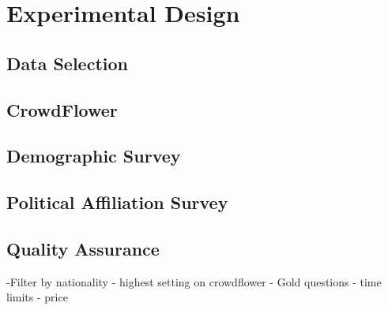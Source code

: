 \chapter{Experimental Design}
\section{Data Selection}
\section{CrowdFlower}
\section{Demographic Survey}
\section{Political Affiliation Survey}
\section{Quality Assurance}
-Filter by nationality
- highest setting on crowdflower
- Gold questions
- time limits
- price